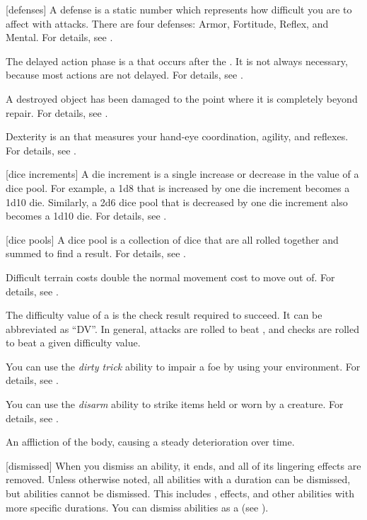 [defenses] A defense is a static number which represents how difficult you are to affect with attacks.
There are four defenses: Armor, Fortitude, Reflex, and Mental.
For details, see .

 The delayed action phase is a  that occurs after the .
It is not always necessary, because most actions are not delayed.
For details, see .

 A destroyed object has been damaged to the point where it is completely beyond repair.
For details, see .

 Dexterity is an  that measures your hand-eye coordination, agility, and reflexes.
For details, see .

[dice increments] A die increment is a single increase or decrease in the value of a dice pool.
For example, a 1d8 that is increased by one die increment becomes a 1d10 die.
Similarly, a 2d6 dice pool that is decreased by one die increment also becomes a 1d10 die.
For details, see .

[dice pools] A dice pool is a collection of dice that are all rolled together and summed to find a result.
For details, see .

 Difficult terrain costs double the normal movement cost to move out of.
For details, see .

 The difficulty value of a  is the check result required to succeed.
It can be abbreviated as ``DV''.
In general, attacks are rolled to beat , and checks are rolled to beat a given difficulty value.

 You can use the \textit{dirty trick} ability to impair a foe by using your environment.
For details, see .

 You can use the \textit{disarm} ability to strike items held or worn by a creature.
For details, see .

 An affliction of the body, causing a steady deterioration over time.

[dismissed] When you dismiss an ability, it ends, and all of its lingering effects are removed.
Unless otherwise noted, all  abilities with a duration can be dismissed, but  abilities cannot be dismissed.
This includes ,  effects, and other abilities with more specific durations.
You can dismiss abilities as a  (see ).

